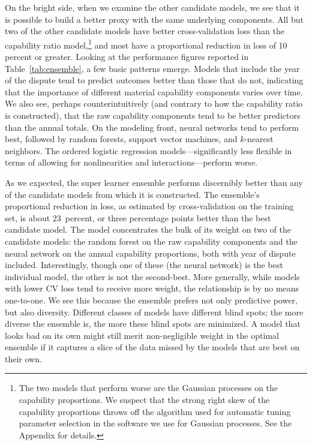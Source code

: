 On the bright side, when we examine the other candidate models, we see that it is possible to build a better proxy with the same underlying components.
All but two of the other candidate models have better cross-validation loss than the capability ratio model,\footnote{
  The two models that perform worse are the Gaussian processes on the capability proportions.
  We suspect that the strong right skew of the capability proportions throws off the algorithm used for automatic tuning parameter selection in the software we use for Gaussian processes.
  See the Appendix for details.
}
and most have a proportional reduction in loss of 10 percent or greater.
Looking at the performance figures reported in Table~\ref{tab:ensemble}, a few basic patterns emerge.
Models that include the year of the dispute tend to predict outcomes better than those that do not, indicating that the importance of different material capability components varies over time.
We also see, perhaps counterintuitively (and contrary to how the capability ratio is constructed), that the raw capability components tend to be better predictors than the annual totals.
On the modeling front, neural networks tend to perform best, followed by random forests, support vector machines, and $k$-nearest neighbors.
The ordered logistic regression models---significantly less flexible in terms of allowing for nonlinearities and interactions---perform worse.

As we expected, the super learner ensemble performs discernibly better than any of the candidate models from which it is constructed.
The ensemble's proportional reduction in loss, as estimated by cross-validation on the training set, is about 23~percent, or three percentage points better than the best candidate model.
The model concentrates the bulk of its weight on two of the candidate models: the random forest on the raw capability components and the neural network on the annual capability proportions, both with year of dispute included.
Interestingly, though one of these (the neural network) is the best individual model, the other is not the second-best.
More generally, while models with lower CV loss tend to receive more weight, the relationship is by no means one-to-one.
We see this because the ensemble prefers not only predictive power, but also diversity.
Different classes of models have different blind spots; the more diverse the ensemble is, the more these blind spots are minimized.
A model that looks bad on its own might still merit non-negligible weight in the optimal ensemble if it captures a slice of the data missed by the models that are best on their own.

